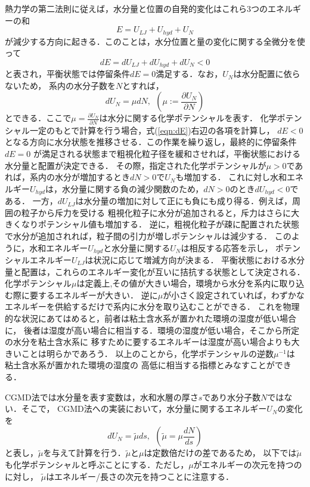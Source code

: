熱力学の第二法則に従えば，水分量と位置の自発的変化はこれら3つのエネルギーの和
\begin{equation}
	E=U_{LJ}+U_{hyd}+U_{N}
	\label{eqn:}
\end{equation}
が減少する方向に起きる．このことは，水分位置と量の変化に関する全微分を使って
\begin{equation}
	dE = dU_{LJ}+dU_{hyd}+dU_N <0
	\label{eqn:dE}
\end{equation}
と表され，平衡状態では停留条件$dE=0$満足する．なお，$U_N$は水分配置に依らないため，
系内の水分子数を$N$とすれば，
\begin{equation}
	dU_N=\mu dN, \ \ \left(  \mu:=\frac{\partial U_N}{\partial N}\right)
	\label{eqn:}
\end{equation}
とできる．ここで$\mu=\frac{\partial U_N}{\partial N}$は水分に関する化学ポテンシャルを表す．
化学ポテンシャル一定のもとで計算を行う場合，式(\ref{eqn:dE})右辺の各項を計算し，
$dE<0$となる方向に水分状態を推移させる．この作業を繰り返し，最終的に停留条件$dE=0$
が満足される状態まで粗視化粒子径を緩和させれば，平衡状態における水分量と配置が決定できる．
その際，指定された化学ポテンシャルが$\mu>0$であれば，系内の水分が増加するとき$dN>0$で$U_N$も増加する．
これに対し水和エネルギー$U_{hyd}$は，水分量に関する負の減少関数のため，$dN>0$のとき$dU_{hyd}<0$である．
一方，$dU_{LJ}$は水分量の増加に対して正にも負にも成り得る．例えば，周囲の粒子から斥力を受ける
粗視化粒子に水分が追加されると，斥力はさらに大きくなりポテンシャル値も増加する．
逆に，粗視化粒子が疎に配置された状態で水分が追加されれば，粒子間の引力が増しポテンシャルは減少する．
このように，水和エネルギー$U_{hyd}$と水分量に関する$U_N$は相反する応答を示し，
ポテンシャルエネルギー$U_{LJ}$は状況に応じて増減方向が決まる．
平衡状態における水分量と配置は，これらのエネルギー変化が互いに拮抗する状態として決定される．
化学ポテンシャル$\mu$は定義上,その値が大きい場合，環境から水分を系内に取り込む際に要するエネルギーが大きい．
逆に$\mu$が小さく設定されていれば，わずかなエネルギーを供給するだけで系内に水分を取り込むことができる．
これを物理的な状況にあてはめると，前者は粘土含水系が置かれた環境の湿度が低い場合に，
後者は湿度が高い場合に相当する．環境の湿度が低い場合，そこから所定の水分を粘土含水系に
移すために要するエネルギーは湿度が高い場合よりも大きいことは明らかであろう．
以上のことから，化学ポテンシャルの逆数$\mu^{-1}$は 粘土含水系が置かれた環境の湿度の
高低に相当する指標とみなすことができる．

CGMD法では水分量を表す変数は，水和水層の厚さ$s$であり水分子数$N$ではない．そこで，
CGMD法への実装において，水分量に関するエネルギー$U_N$の変化を
\begin{equation}
	dU_N=\tilde \mu ds, \ \ \left( \tilde \mu =\mu \frac{dN}{ds} \right)
	\label{eqn:}
\end{equation}
と表し，$\tilde \mu$を与えて計算を行う．$\tilde \mu$と$\mu$は定数倍だけの差であるため，
以下では$\tilde \mu$も化学ポテンシャルと呼ぶことにする．ただし，$\mu$がエネルギーの次元を持つのに対し，
$\tilde \mu$はエネルギー/長さの次元を持つことに注意する．
